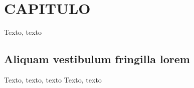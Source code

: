 \documentclass[
	12pt,				%
	openany,
	oneside,			%
	a4paper,			%
	chapter=TITLE,		%
	english,			%
	brazil				%
]{abntex2}
\begin{document}

\frenchspacing

\pretextual

\imprimircapa

\imprimirfolhaderosto

\tableofcontents*
\cleardoublepage

\textual

\chapter{CAPITULO}

	Texto, texto

\section{Aliquam vestibulum fringilla lorem}

	Texto, texto, texto Texto, texto

\postextual


\end{document}
